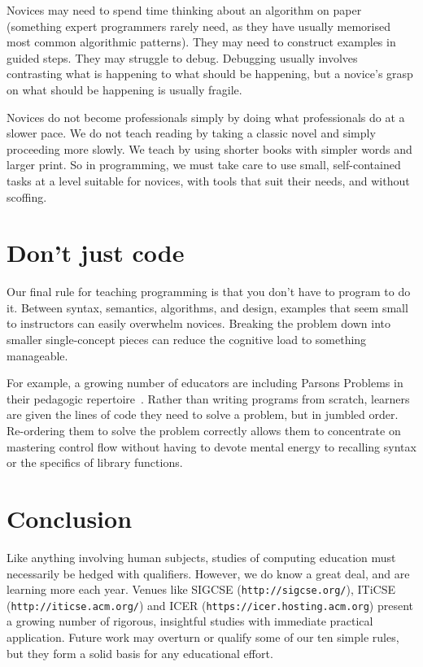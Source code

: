 \documentclass[10pt,letterpaper]{article}
\newcommand{\rulemajor}[2]{\section{#1}\label{#2}}
\newcommand{\url}[1]{\texttt{#1}}
\begin{document}
Novices may need to spend time thinking about an algorithm on paper
(something expert programmers rarely need,
as they have usually memorised most common algorithmic patterns).
They may need to construct examples in guided steps.
They may struggle to debug.
Debugging usually involves contrasting what is happening to what should be happening,
but a novice's grasp on what should be happening is usually fragile.

Novices do not become professionals simply by doing what professionals do at a slower pace.
We do not teach reading by taking a classic novel and simply proceeding more slowly.
We teach by using shorter books with simpler words and larger print.
So in programming,
we must take care to use small, self-contained tasks at a level suitable for novices,
with tools that suit their needs, and without scoffing.

\rulemajor{Don't just code}{not-just-code}

Our final rule for teaching programming is that you don't have to program to do it.
Between syntax, semantics, algorithms, and design,
examples that seem small to instructors can easily overwhelm novices.
Breaking the problem down into smaller single-concept pieces
can reduce the cognitive load to something manageable.

For example,
a growing number of educators are including Parsons Problems
in their pedagogic repertoire~\cite{parsons,morrison-parsons}.
Rather than writing programs from scratch,
learners are given the lines of code they need to solve a problem,
but in jumbled order.
Re-ordering them to solve the problem correctly
allows them to concentrate on mastering control flow
without having to devote mental energy to recalling syntax
or the specifics of library functions.

\section*{Conclusion}

Like anything involving human subjects,
studies of computing education must necessarily be hedged with qualifiers.
However,
we do know a great deal,
and are learning more each year.
Venues like SIGCSE (\url{http://sigcse.org/}), ITiCSE (\url{http://iticse.acm.org/}) and ICER (\url{https://icer.hosting.acm.org})
present a growing number of rigorous, insightful studies
with immediate practical application.
Future work may overturn or qualify some of our ten simple rules,
but they form a solid basis for any educational effort.
\end{document}
